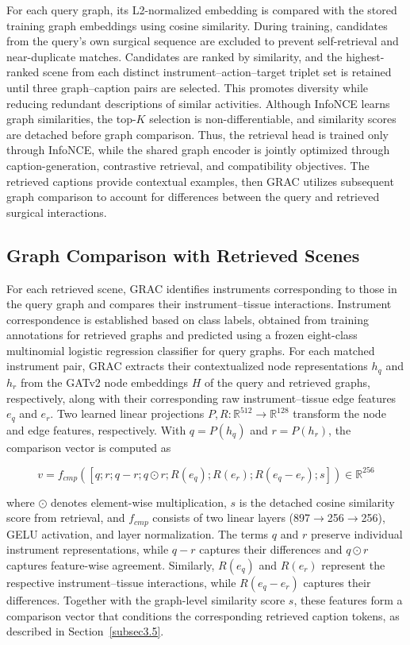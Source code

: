 \documentclass[11pt]{article}
\begin{document}
For each query graph, its L2-normalized embedding is compared with the stored training graph embeddings using cosine similarity. During training, candidates from the query's own surgical sequence are excluded to prevent self-retrieval and near-duplicate matches. Candidates are ranked by similarity, and the highest-ranked scene from each distinct instrument–action–target triplet set is retained until three graph–caption pairs are selected. This promotes diversity while reducing redundant descriptions of similar activities. Although InfoNCE learns graph similarities, the top-$K$ selection is non-differentiable, and similarity scores are detached before graph comparison. Thus, the retrieval head is trained only through InfoNCE, while the shared graph encoder is jointly optimized through caption-generation, contrastive retrieval, and compatibility objectives. The retrieved captions provide contextual examples, then GRAC utilizes subsequent graph comparison to account for differences between the query and retrieved surgical interactions.


\subsection{Graph Comparison with Retrieved Scenes}\label{subsec3.4}

For each retrieved scene, GRAC identifies instruments corresponding to those in the query graph and compares their instrument–tissue interactions. Instrument correspondence is established based on class labels, obtained from training annotations for retrieved graphs and predicted using a frozen eight-class multinomial logistic regression classifier for query graphs. For each matched instrument pair, GRAC extracts their contextualized node representations $h_q$ and $h_r$ from the GATv2 node embeddings $H$ of the query and retrieved graphs, respectively, along with their corresponding raw instrument–tissue edge features $e_q$ and $e_r$. Two learned linear projections $P,R:\mathbb{R}^{512}\rightarrow\mathbb{R}^{128}$ transform the node and edge features, respectively. With $q=P(h_q)$ and $r=P(h_r)$, the comparison vector is computed as


\begin{equation}
v = f_{cmp}\left( \left[ q;r;q-r;q\odot r;R(e_q);R(e_r);R(e_q-e_r);s \right] \right) \in \mathbb{R}^{256}
\label{eq3}
\end{equation}

where $\odot$ denotes element-wise multiplication, $s$ is the detached cosine similarity score from retrieval, and $f_{cmp}$ consists of two linear layers (897$\rightarrow$256$\rightarrow$256), GELU activation, and layer normalization. The terms $q$ and $r$ preserve individual instrument representations, while $q-r$ captures their differences and $q\odot r$ captures feature-wise agreement. Similarly, $R(e_q)$ and $R(e_r)$ represent the respective instrument–tissue interactions, while $R(e_q-e_r)$ captures their differences. Together with the graph-level similarity score $s$, these features form a comparison vector that conditions the corresponding retrieved caption tokens, as described in Section~\ref{subsec3.5}.
\end{document}
